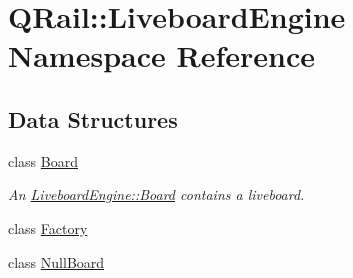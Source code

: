 \hypertarget{namespaceQRail_1_1LiveboardEngine}{}\section{Q\+Rail\+::Liveboard\+Engine Namespace Reference}
\label{namespaceQRail_1_1LiveboardEngine}
\subsection*{Data Structures}
\begin{DoxyCompactItemize}
\item 
class \mbox{\hyperlink{classQRail_1_1LiveboardEngine_1_1Board}{Board}}
\begin{DoxyCompactList}\small\item\em An \mbox{\hyperlink{classQRail_1_1LiveboardEngine_1_1Board}{Liveboard\+Engine\+::\+Board}} contains a liveboard. \end{DoxyCompactList}\item 
class \mbox{\hyperlink{classQRail_1_1LiveboardEngine_1_1Factory}{Factory}}
\item 
class \mbox{\hyperlink{classQRail_1_1LiveboardEngine_1_1NullBoard}{Null\+Board}}
\end{DoxyCompactItemize}
